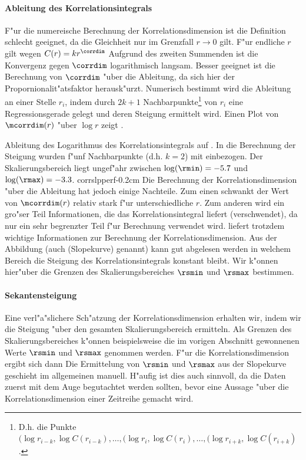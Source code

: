 \paragraph{Ableitung des Korrelationsintegrals}
F"ur die numereische Berechnung der Korrelationsdimension ist die Definition
 schlecht geeignet, da die Gleichheit nur im Grenzfall $r\to 0$ gilt. F"ur 
endliche $r$ gilt wegen $C(r)=k r^{\corrdim}$
Aufgrund des zweiten Summenden ist die Konvergenz gegen $\corrdim$ logarithmisch langsam.
Besser geeignet ist die Berechnung von $\corrdim$ "uber die Ableitung, da sich hier der
Propornionalit"atsfaktor herausk"urzt.
Numerisch bestimmt wird die Ableitung an einer Stelle $r_i$, indem durch $2k+1$
Nachbarpunkte\footnote{D.h. die Punkte $(\log r_{i-k}, \log C(r_{i-k}),\dots,(\log r_i,
\log C(r_i),\dots,(\log r_{i+k}, \log C(r_{i+k})$. } von $r_i$ eine Regressionsgerade
gelegt und deren Steigung ermittelt wird. Einen Plot von $\mcorrdim(r)$ "uber $\log r$
zeigt .

{Ableitung des Logarithmus des Korrelationsintegrals auf . In die
Berechnung der Steigung wurden f"unf Nachbarpunkte (d.h. $k=2$) mit einbezogen. Der
Skalierungsbereich liegt ungef"ahr zwischen $\log(\rmin)=-5.7$ und $\log(\rmax)=-3.3$.}
{corrslpperf}{-0.2cm}
Die Berechnung der Korrelationsdimension "uber die Ableitung hat jedoch einige
Nachteile. Zum einen schwankt der Wert von $\mcorrdim(r)$ relativ stark f"ur
unterschiedliche $r$. Zum anderen wird ein gro"ser Teil Informationen, die das
Korrelationsintegral liefert \naja(verschwendet), da nur ein sehr begrenzter Teil f"ur
Berechnung verwendet wird.  liefert trotzdem wichtige Informationen zur 
Berechnung der Korrelationsdimension. Aus der Abbildung (auch \begriff(Slopekurve)
genannt) kann gut abgelesen werden in welchem Bereich die Steigung des
Korrelationsintegrals konstant bleibt. Wir k"onnen hier"uber die Grenzen des
Skalierungsbereiches $\rsmin$ und $\rsmax$ bestimmen. 

\paragraph{Sekantensteigung}
Eine verl"a"slichere Sch"atzung der Korrelationsdimension erhalten wir, indem wir die
Steigung "uber den gesamten Skalierungsbereich ermitteln. Als Grenzen des
Skalierungsbereiches k"onnen beispielsweise die im vorigen Abschnitt gewonnenen Werte
$\rsmin$ und $\rsmax$ genommen werden. F"ur die Korrelationsdimension ergibt sich dann
Die Ermittelung von $\rsmin$ und $\rsmax$ aus der Slopekurve geschieht im allgemeinen
manuell. H"aufig ist dies auch sinnvoll, da die Daten zuerst mit dem Auge begutachtet
werden sollten, bevor eine Aussage "uber die Korrelationsdimension einer Zeitreihe gemacht
wird. 

